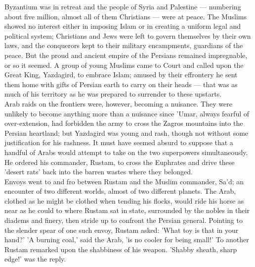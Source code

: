 \documentclass[10pt, twoside,openright]{book}
\begin{document}
Byzantium was in retreat and the people of Syria and Palestine --- numbering about five million, almost all of them Christians --- were at peace. The Muslims showed no interest either in imposing Islam or in creating a uniform legal and political system; Christians and Jews were left to govern themselves by their own laws, and the conquerors kept to their military encampments, guardians of the peace. But the proud and ancient empire of the Persians remained impregnable, or so it seemed. A group of young Muslims came to Court and called upon the Great King, Yazdagird, to embrace Islam; amused by their effrontery he sent them home with gifts of Persian earth to carry on their heads --- that was as much of his territory as he was prepared to surrender to these upstarts. \\

Arab raids on the frontiers were, however, becoming a nuisance. They were unlikely to become anything more than a nuisance since 'Umar, always fearful of over\hyp{}extension, had forbidden the army to cross the Zagros mountains into the Persian heartland; but Yazdagird was young and rash, though not without some justification for his rashness. It must have seemed absurd to suppose that a handful of Arabs would attempt to take on the two superpowers simultaneously. He ordered his commander, Rustam, to cross the Euphrates and drive these 'desert rats' back into the barren wastes where they belonged. \\

Envoys went to and fro between Rustam and the Muslim commander, Sa'd; an encounter of two different worlds, almost of two different planets. The Arab, clothed as he might be clothed when tending his flocks, would ride his horse as near as he could to where Rustam sat in state, surrounded by the nobles in their diadems and finery, then stride up to confront the Persian general. Pointing to the slender spear of one such envoy, Rustam asked: 'What toy is that in your hand?' 'A burning coal,' said the Arab, 'is no cooler for being small!' To another Rustam remarked upon the shabbiness of his weapon. 'Shabby sheath, sharp edge!' was the reply. \\
\end{document}
